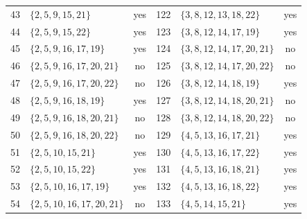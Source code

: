 \documentclass[aps,pra,reprint,superscriptaddress,longbibliography,nofootinbib,floatfix,10pt]{revtex4-2}
\theoremstyle{definition}
\begin{document}
\begin{longtable}{rlc@{\qquad}rlc}
43 & $\{2,\allowbreak 5,\allowbreak 9,\allowbreak 15,\allowbreak 21\}$ & yes & 122 & $\{3,\allowbreak 8,\allowbreak 12,\allowbreak 13,\allowbreak 18,\allowbreak 22\}$ & yes\\
44 & $\{2,\allowbreak 5,\allowbreak 9,\allowbreak 15,\allowbreak 22\}$ & yes & 123 & $\{3,\allowbreak 8,\allowbreak 12,\allowbreak 14,\allowbreak 17,\allowbreak 19\}$ & yes\\
45 & $\{2,\allowbreak 5,\allowbreak 9,\allowbreak 16,\allowbreak 17,\allowbreak 19\}$ & yes & 124 & $\{3,\allowbreak 8,\allowbreak 12,\allowbreak 14,\allowbreak 17,\allowbreak 20,\allowbreak 21\}$ & no\\
46 & $\{2,\allowbreak 5,\allowbreak 9,\allowbreak 16,\allowbreak 17,\allowbreak 20,\allowbreak 21\}$ & no & 125 & $\{3,\allowbreak 8,\allowbreak 12,\allowbreak 14,\allowbreak 17,\allowbreak 20,\allowbreak 22\}$ & no\\
47 & $\{2,\allowbreak 5,\allowbreak 9,\allowbreak 16,\allowbreak 17,\allowbreak 20,\allowbreak 22\}$ & no & 126 & $\{3,\allowbreak 8,\allowbreak 12,\allowbreak 14,\allowbreak 18,\allowbreak 19\}$ & yes\\
48 & $\{2,\allowbreak 5,\allowbreak 9,\allowbreak 16,\allowbreak 18,\allowbreak 19\}$ & yes & 127 & $\{3,\allowbreak 8,\allowbreak 12,\allowbreak 14,\allowbreak 18,\allowbreak 20,\allowbreak 21\}$ & no\\
49 & $\{2,\allowbreak 5,\allowbreak 9,\allowbreak 16,\allowbreak 18,\allowbreak 20,\allowbreak 21\}$ & no & 128 & $\{3,\allowbreak 8,\allowbreak 12,\allowbreak 14,\allowbreak 18,\allowbreak 20,\allowbreak 22\}$ & no\\
50 & $\{2,\allowbreak 5,\allowbreak 9,\allowbreak 16,\allowbreak 18,\allowbreak 20,\allowbreak 22\}$ & no & 129 & $\{4,\allowbreak 5,\allowbreak 13,\allowbreak 16,\allowbreak 17,\allowbreak 21\}$ & yes\\
51 & $\{2,\allowbreak 5,\allowbreak 10,\allowbreak 15,\allowbreak 21\}$ & yes & 130 & $\{4,\allowbreak 5,\allowbreak 13,\allowbreak 16,\allowbreak 17,\allowbreak 22\}$ & yes\\
52 & $\{2,\allowbreak 5,\allowbreak 10,\allowbreak 15,\allowbreak 22\}$ & yes & 131 & $\{4,\allowbreak 5,\allowbreak 13,\allowbreak 16,\allowbreak 18,\allowbreak 21\}$ & yes\\
53 & $\{2,\allowbreak 5,\allowbreak 10,\allowbreak 16,\allowbreak 17,\allowbreak 19\}$ & yes & 132 & $\{4,\allowbreak 5,\allowbreak 13,\allowbreak 16,\allowbreak 18,\allowbreak 22\}$ & yes\\
54 & $\{2,\allowbreak 5,\allowbreak 10,\allowbreak 16,\allowbreak 17,\allowbreak 20,\allowbreak 21\}$ & no & 133 & $\{4,\allowbreak 5,\allowbreak 14,\allowbreak 15,\allowbreak 21\}$ & yes\\

\end{longtable}
\end{document}
